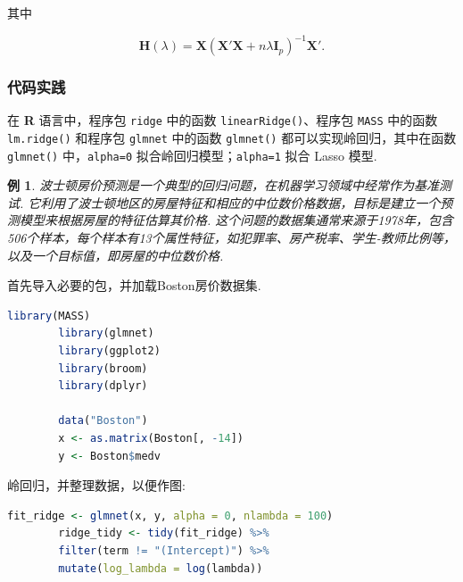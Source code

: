 \documentclass[12pt, a4paper, oneside]{ctexart}
\newtheorem{example}[theorem]{例}
\begin{document}
	其中
	
	\begin{equation}
		\bm{H}(\lambda) = \bm{X}(\bm{X}'\bm{X} + n\lambda \bm{I}_p)^{-1} \bm{X}'.
	\end{equation}
	
	\subsubsection{代码实践}
	
	在 \textbf{R} 语言中，程序包 \texttt{ridge} 中的函数 \texttt{linearRidge()}、程序包 \texttt{MASS} 中的函数 \texttt{lm.ridge()} 和程序包 \texttt{glmnet} 中的函数 \texttt{glmnet()} 都可以实现岭回归，其中在函数 \texttt{glmnet()} 中，\texttt{alpha=0} 拟合岭回归模型；\texttt{alpha=1} 拟合 Lasso 模型.
	
	\begin{example}
		波士顿房价预测是一个典型的回归问题，在机器学习领域中经常作为基准测试. 它利用了波士顿地区的房屋特征和相应的中位数价格数据，目标是建立一个预测模型来根据房屋的特征估算其价格. 这个问题的数据集通常来源于1978年，包含506个样本，每个样本有13个属性特征，如犯罪率、房产税率、学生-教师比例等，以及一个目标值，即房屋的中位数价格.
	\end{example}
	
	首先导入必要的包，并加载Boston房价数据集.
	\begin{lstlisting}[language=R]
		library(MASS)
		library(glmnet)
		library(ggplot2)
		library(broom)
		library(dplyr)
		
		data("Boston")
		x <- as.matrix(Boston[, -14])
		y <- Boston$medv
	\end{lstlisting}
	
	岭回归，并整理数据，以便作图:
	\begin{lstlisting}[language=R]
		fit_ridge <- glmnet(x, y, alpha = 0, nlambda = 100)
		ridge_tidy <- tidy(fit_ridge) %>%
		filter(term != "(Intercept)") %>%
		mutate(log_lambda = log(lambda))
	\end{lstlisting}
	
\end{document}
